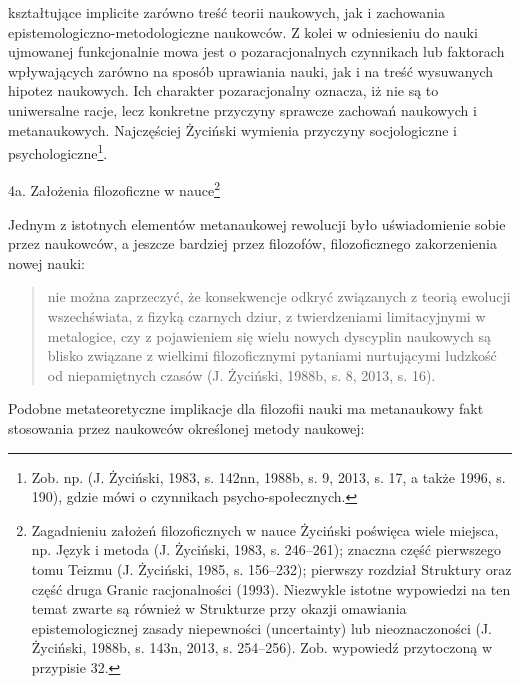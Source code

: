 \documentclass{article}
\begin{document}
kształtujące implicite zarówno treść teorii naukowych, jak i zachowania epistemologiczno-metodologiczne naukowców. Z
kolei w odniesieniu do nauki ujmowanej funkcjonalnie mowa jest o pozaracjonalnych czynnikach lub faktorach wpływających
zarówno na sposób uprawiania nauki, jak i na treść wysuwanych hipotez naukowych. Ich charakter pozaracjonalny oznacza,
iż nie są to uniwersalne racje, lecz konkretne przyczyny sprawcze zachowań naukowych i metanaukowych. Najczęściej
Życiński wymienia przyczyny socjologiczne i psychologiczne\footnote{Zob. np.  \label{ref:RNDijWA45P0nD}(J. Życiński,
1983, s. 142nn, 1988b, s. 9, 2013, s. 17,  a także 1996, s. 190), gdzie mówi o czynnikach psycho-społecznych.}.

4a. Założenia filozoficzne w nauce\footnote{Zagadnieniu założeń filozoficznych w nauce Życiński poświęca wiele miejsca,
np. Język i metoda \label{ref:RNDXAivjQttgc}(J. Życiński, 1983, s. 246–261); znaczna część pierwszego tomu Teizmu
\label{ref:RND6qvog2NMv7}(J. Życiński, 1985, s. 156–232); pierwszy rozdział Struktury oraz część druga Granic
racjonalności (1993). Niezwykle istotne wypowiedzi na ten temat zwarte są również w Strukturze przy okazji omawiania
epistemologicznej zasady niepewności (uncertainty) lub nieoznaczoności \label{ref:RND7zd8YYNkba}(J. Życiński, 1988b, s.
143n, 2013, s. 254–256). Zob. wypowiedź przytoczoną w przypisie 32.}

Jednym z istotnych elementów metanaukowej rewolucji było uświadomienie sobie przez naukowców, a jeszcze bardziej przez
filozofów, filozoficznego zakorzenienia nowej nauki:

\begin{quotation}
nie można zaprzeczyć, że konsekwencje odkryć związanych z teorią ewolucji wszechświata, z fizyką czarnych dziur, z
twierdzeniami limitacyjnymi w metalogice, czy z pojawieniem się wielu nowych dyscyplin naukowych są blisko związane z
wielkimi filozoficznymi pytaniami nurtującymi ludzkość od niepamiętnych czasów \label{ref:RNDlgeSSJugD6}(J. Życiński,
1988b, s. 8, 2013, s. 16).  

\end{quotation}
Podobne metateoretyczne implikacje dla filozofii nauki ma metanaukowy fakt stosowania przez naukowców określonej metody
naukowej: 
\end{document}
